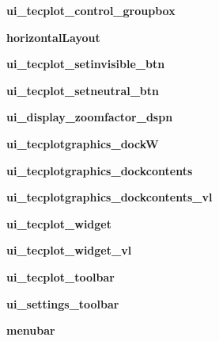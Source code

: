 \begin{DoxyCompactItemize}
\item 
\hypertarget{a00099_a1ed7a735f4879c9335af120f50f99554}{}\label{a00099_a1ed7a735f4879c9335af120f50f99554} 
{\bfseries ui\+\_\+tecplot\+\_\+control\+\_\+groupbox}
\item 
\hypertarget{a00099_ae4ccda1baa67cbf1b90aeaf28c792f52}{}\label{a00099_ae4ccda1baa67cbf1b90aeaf28c792f52} 
{\bfseries horizontal\+Layout}
\item 
\hypertarget{a00099_a7efc66f5379a990bb2d613efad8af792}{}\label{a00099_a7efc66f5379a990bb2d613efad8af792} 
{\bfseries ui\+\_\+tecplot\+\_\+setinvisible\+\_\+btn}
\item 
\hypertarget{a00099_a7a5d64ed74f4a2a389cfbd88660084ea}{}\label{a00099_a7a5d64ed74f4a2a389cfbd88660084ea} 
{\bfseries ui\+\_\+tecplot\+\_\+setneutral\+\_\+btn}
\item 
\hypertarget{a00099_aab2a02b2ad9ef412370fa6ce21aba778}{}\label{a00099_aab2a02b2ad9ef412370fa6ce21aba778} 
{\bfseries ui\+\_\+display\+\_\+zoomfactor\+\_\+dspn}
\item 
\hypertarget{a00099_a6ac6813ef0dc08cb729b515d9edfd656}{}\label{a00099_a6ac6813ef0dc08cb729b515d9edfd656} 
{\bfseries ui\+\_\+tecplotgraphics\+\_\+dockW}
\item 
\hypertarget{a00099_a833a8408dc99f9eedbb331e8e360bdf5}{}\label{a00099_a833a8408dc99f9eedbb331e8e360bdf5} 
{\bfseries ui\+\_\+tecplotgraphics\+\_\+dockcontents}
\item 
\hypertarget{a00099_a9937dfdabe6438f3bfec3ba0c6976557}{}\label{a00099_a9937dfdabe6438f3bfec3ba0c6976557} 
{\bfseries ui\+\_\+tecplotgraphics\+\_\+dockcontents\+\_\+vl}
\item 
\hypertarget{a00099_a7e3ee3296fa5786336d90635c2442045}{}\label{a00099_a7e3ee3296fa5786336d90635c2442045} 
{\bfseries ui\+\_\+tecplot\+\_\+widget}
\item 
\hypertarget{a00099_a617fa074367d63edd758567a5d67b398}{}\label{a00099_a617fa074367d63edd758567a5d67b398} 
{\bfseries ui\+\_\+tecplot\+\_\+widget\+\_\+vl}
\item 
\hypertarget{a00099_afbd7bdb7c0f0d9d24bad52a80454d101}{}\label{a00099_afbd7bdb7c0f0d9d24bad52a80454d101} 
{\bfseries ui\+\_\+tecplot\+\_\+toolbar}
\item 
\hypertarget{a00099_a34720910fa97b9e65de72cbee6a12803}{}\label{a00099_a34720910fa97b9e65de72cbee6a12803} 
{\bfseries ui\+\_\+settings\+\_\+toolbar}
\item 
\hypertarget{a00099_a265e28ccad6c1cd4a94a22965fe6c536}{}\label{a00099_a265e28ccad6c1cd4a94a22965fe6c536} 
{\bfseries menubar}
\item 

\end{DoxyCompactItemize}

